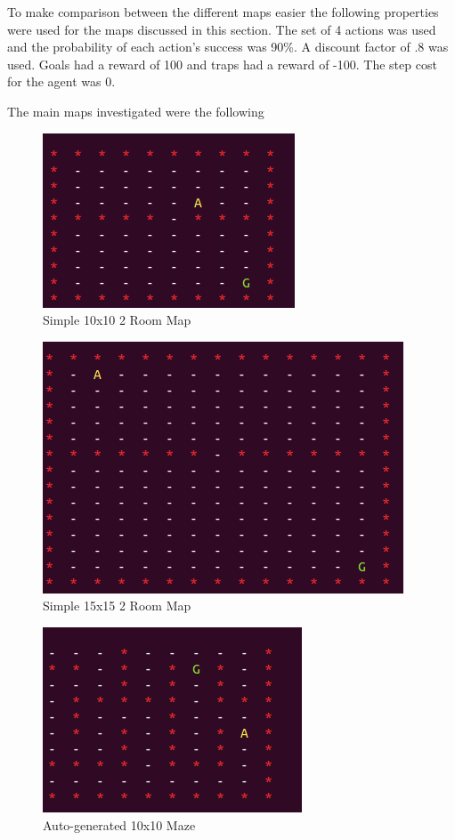 \documentclass[12pt, letterpaper, final]{report}
\begin{document}
To make comparison between the different maps easier the following
properties were used for the maps discussed in this section. The
set of 4 actions was used and the probability of each action's success
was 90\%. A discount factor of .8 was used. Goals had a reward of 100
and traps had a reward of -100. The step cost for the agent was 0.

The main maps investigated were the following

\FloatBarrier
\begin{figure}[h!]
\centering
\includegraphics[scale=.5]{images/10x102room.png}
\caption{Simple 10x10 2 Room Map}
\label{10x102roomMap}
\end{figure}
\FloatBarrier

\FloatBarrier
\begin{figure}[h!]
\centering
\includegraphics[scale=.5]{images/15x152room.png}
\caption{Simple 15x15 2 Room Map}
\label{15x152roomMap}
\end{figure}
\FloatBarrier

\FloatBarrier
\begin{figure}[h!]
\centering
\includegraphics[scale=.5]{images/maze01_world.png}
\caption{Auto-generated 10x10 Maze}
\label{10x102roomMap}
\end{figure}
\FloatBarrier
\end{document}
